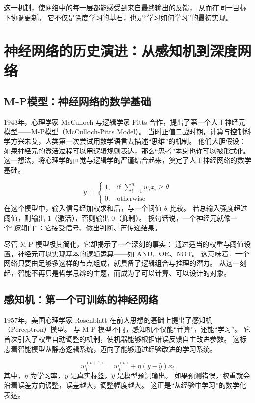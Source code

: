 这一机制，使网络中的每一层都能感受到来自最终输出的反馈，  
从而在同一目标下协调更新。  
它不仅是深度学习的基石，也是“学习如何学习”的最初实现。

\section{神经网络的历史演进：从感知机到深度网络}

\subsection{M-P模型：神经网络的数学基础}

1943年，心理学家 McCulloch 与逻辑学家 Pitts 合作，提出了第一个人工神经元模型——M-P模型（McCulloch-Pitts Model）。  
当时正值二战时期，计算与控制科学方兴未艾，人类第一次尝试用数学语言去描述“思维”的机制。  
他们大胆假设：如果神经元的激活过程可以用逻辑规则表达，那么“思考”本身也许可以被形式化。  
这一想法，将心理学的直觉与逻辑学的严谨结合起来，奠定了人工神经网络的数学基础。

\begin{equation}
y = 
\begin{cases}
1, & \text{if } \sum_{i=1}^{n} w_i x_i \geq \theta \\
0, & \text{otherwise}
\end{cases}
\end{equation}
在这个模型中，输入信号经加权求和后，与一个阈值 $\theta$ 比较。  
若总输入强度超过阈值，则输出 1（激活），否则输出 0（抑制）。  
换句话说，一个神经元就像一个“逻辑门”：它接受信号、做出判断、再传递结果。

尽管 M-P 模型极其简化，它却揭示了一个深刻的事实：  
通过适当的权重与阈值设置，神经元可以实现基本的逻辑运算——如 AND、OR、NOT。  
这意味着，一个网络只要由足够多这样的节点组成，就具备了逻辑组合与推理的潜力。  
从这一刻起，智能不再只是哲学思辨的主题，而成为了可以计算、可以设计的对象。

\subsection{感知机：第一个可训练的神经网络}

1957年，美国心理学家 Rosenblatt 在前人思想的基础上提出了感知机（Perceptron）模型。  
与 M-P 模型不同，感知机不仅能“计算”，还能“学习”。  
它首次引入了权重自动调整的机制，使机器能够根据错误反馈自主改进参数。  
这标志着智能模型从静态逻辑系统，迈向了能够通过经验改进的学习系统。

\begin{equation}
w_{i}^{(t+1)} = w_{i}^{(t)} + \eta (y - \hat{y}) x_i
\end{equation}
其中，$\eta$ 为学习率，$y$ 是真实标签，$\hat{y}$ 是模型预测输出。  
如果预测错误，权重就会沿着误差方向调整，误差越大，调整幅度越大。  
这正是“从经验中学习”的数学化表达。

